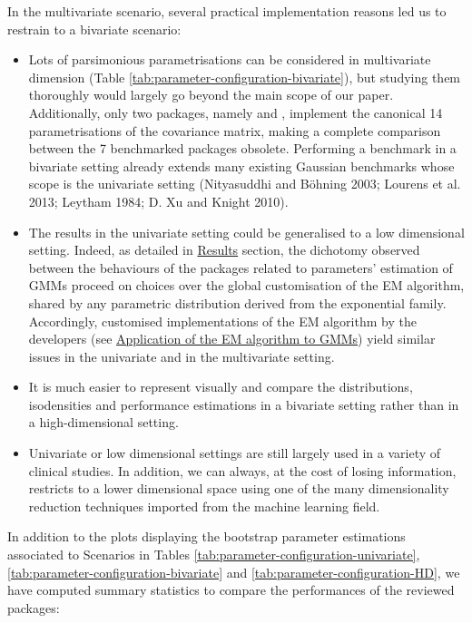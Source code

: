 \color{yellow}

In the multivariate scenario, several practical implementation reasons led us to restrain to a bivariate scenario:

\begin{itemize}
\item
  Lots of parsimonious parametrisations can be considered in multivariate dimension (Table \ref{tab:parameter-configuration-bivariate}), but studying them thoroughly would largely go beyond the main scope of our paper. Additionally, only two packages, namely  and , implement the canonical 14 parametrisations of the covariance matrix, making a complete comparison between the 7 benchmarked packages obsolete. Performing a benchmark in a bivariate setting already extends many existing Gaussian benchmarks whose scope is the univariate setting (Nityasuddhi and Böhning 2003; Lourens et al. 2013; Leytham 1984; D. Xu and Knight 2010).
\item
  The results in the univariate setting could be generalised to a low dimensional setting. Indeed, as detailed in \protect\hyperlink{results}{Results} section, the dichotomy observed between the behaviours of the packages related to parameters' estimation of GMMs proceed on choices over the global customisation of the EM algorithm, shared by any parametric distribution derived from the exponential family. Accordingly, customised implementations of the EM algorithm by the developers (see \protect\hyperlink{application-of-the-em-algorithm-to-gmms}{Application of the EM algorithm to GMMs}) yield similar issues in the univariate and in the multivariate setting.
\item
  It is much easier to represent visually and compare the distributions, isodensities and performance estimations in a bivariate setting rather than in a high-dimensional setting.
\item
  Univariate or low dimensional settings are still largely used in a variety of clinical studies. In addition, we can always, at the cost of losing information, restricts to a lower dimensional space using one of the many dimensionality reduction techniques imported from the machine learning field.
\end{itemize}

\color{black}

In addition to the plots displaying the bootstrap parameter estimations associated to Scenarios in Tables \ref{tab:parameter-configuration-univariate}, \ref{tab:parameter-configuration-bivariate} and \ref{tab:parameter-configuration-HD}, we have computed summary statistics to compare the performances of the reviewed packages:

